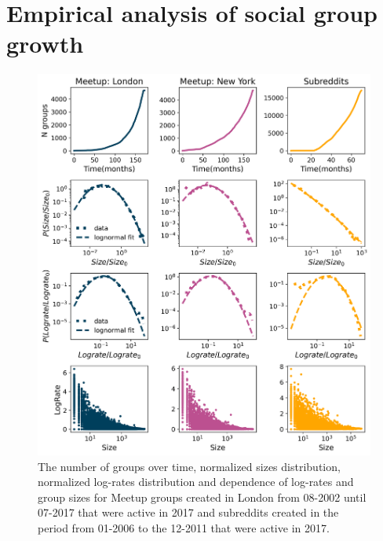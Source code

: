 
\section{Empirical analysis of social group growth \label{sec:emp}}
\begin{figure}[h!]
	\centering
	\includegraphics[width=0.8\linewidth]{Figures/figures/Fig2.png}
	\caption{The number of groups over time, normalized sizes distribution, normalized log-rates distribution and dependence of log-rates and group sizes for Meetup groups created in London from 08-2002 until 07-2017 that were active in 2017 and subreddits created in the period from 01-2006 to the  12-2011 that were active in 2017. }
	\label{fig:data1}
\end{figure}

